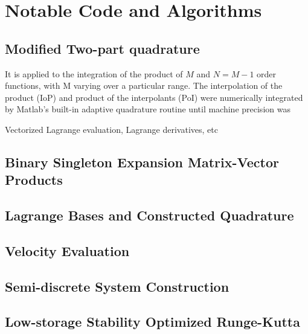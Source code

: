 \documentclass[letterpaper,12pt]{report}
\begin{document}
\chapter{Notable Code and Algorithms}\label{Algs}
\section{Modified Two-part quadrature}

It is applied to the integration of the product of $M$ and $N=M-1$ order functions, with M varying over a particular range. The interpolation of the product (IoP) and product of the interpolants (PoI) were numerically integrated by Matlab's built-in adaptive quadrature routine until machine precision was 

Vectorized Lagrange evaluation, Lagrange derivatives, etc
\newpage
\section{Binary Singleton Expansion Matrix-Vector Products}
\newpage
\section{Lagrange Bases and Constructed Quadrature}
\newpage
\section{Velocity Evaluation}
\section{Semi-discrete System Construction}
\newpage
\section{Low-storage Stability Optimized Runge-Kutta}
%

\end{document}
